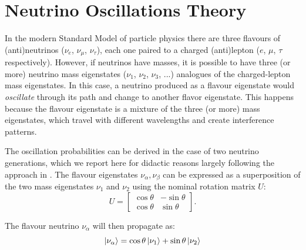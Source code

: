 \section{Neutrino Oscillations Theory}
In the modern Standard Model of particle physics there are three flavours of (anti)neutrinos ($\nu_{e}$, $\nu_{\mu}$, $\nu_{\tau}$), each one paired to a charged (anti)lepton ($e$, $\mu$, $\tau$ respectively). 
However, if neutrinos have masses, it is possible to have three (or more) neutrino mass eigenstates ($\nu_{1}$, $\nu_{2}$, $\nu_{3}$, ...) analogues of the charged-lepton mass eigenstates. 
In this case, a neutrino produced as a flavour eigenstate would \emph{oscillate} through its path and change to another flavor eigenstate. This happens because the flavour eigenstate is a mixture of the three (or more) mass eigenstates, which travel with different wavelengths and create interference patterns. 

The oscillation probabilities can be derived in the case of two neutrino generations, which we report here for didactic reasons largely following the approach in \cite{deGouvea:2004gd}. The flavour eigenstates $\nu_{\alpha}, \nu_{\beta}$ can be expressed as a superposition of the two mass eigenstates $\nu_1$ and $\nu_2$ using the nominal rotation matrix $U$:
\begin{equation}
U = \begin{bmatrix}
    \cos\theta & -\sin\theta \\
    \cos\theta & \sin\theta
    \end{bmatrix}.
\end{equation}

The flavour neutrino $\nu_{\alpha}$ will then propagate as: 
\begin{equation}
    \ket{\nu_{\alpha}} = \cos\theta\ket{\nu_{1}}+\sin\theta\ket{\nu_{2}}
\end{equation}

